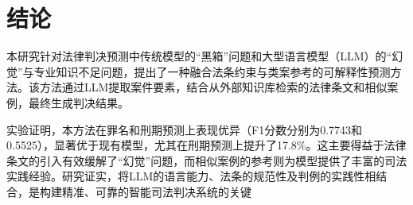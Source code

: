 
\section{\heiti 结论}
本研究针对法律判决预测中传统模型的“黑箱”问题和大型语言模型（LLM）的“幻觉”与专业知识不足问题，提出了一种融合法条约束与类案参考的可解释性预测方法。该方法通过LLM提取案件要素，结合从外部知识库检索的法律条文和相似案例，最终生成判决结果。

实验证明，本方法在罪名和刑期预测上表现优异（F1分数分别为0.7743和0.5525），显著优于现有模型，尤其在刑期预测上提升了17.8\%。这主要得益于法律条文的引入有效缓解了“幻觉”问题，而相似案例的参考则为模型提供了丰富的司法实践经验。研究证实，将LLM的语言能力、法条的规范性及判例的实践性相结合，是构建精准、可靠的智能司法判决系统的关键